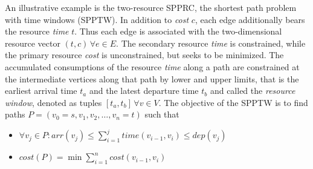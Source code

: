 \begin{definition}[SPPTW]
An illustrative example is the two-resource SPPRC, the shortest path problem with time windows (SPPTW). In addition to \textit{cost} $c$, each edge additionally bears the resource \textit{time} $t$. Thus each edge is associated with the two-dimensional resource vector $(t,c) \, \forall e \in E$. The secondary resource \textit{time} is constrained, while the primary resource \textit{cost} is unconstrained, but seeks to be minimized. The accumulated consumptions of the resource \textit{time} along a path are constrained at the intermediate vertices along that path by lower and upper limits, that is the earliest arrival time $t_a$ and the latest departure time $t_b$ and called the \textit{resource window}, denoted as tuples $[t_a,t_b] \, \forall v \in V$. The objective of the SPPTW is to find paths $P=(v_0=s,v_1,v_2,\dots,v_n=t)$ such that 
\begin{itemize}
	\item $\forall v_j \in P: arr(v_j) \leq \sum_{i=1}^{j}{time(v_{i-1},v_{i})} \leq dep(v_j)$
	\item $cost(P) = \min{\sum_{i=1}^{n}cost(v_{i-1},v_i)}$
\end{itemize}
\end{definition}



